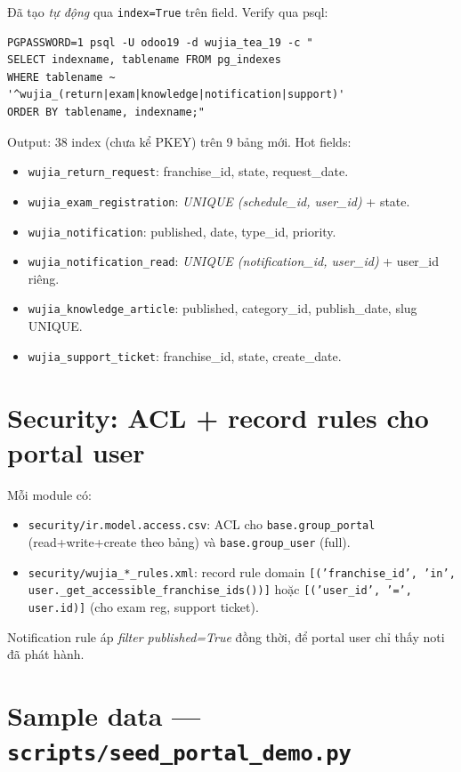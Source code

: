 Đã tạo \emph{tự động} qua \texttt{index=True} trên field. Verify qua psql:

\begin{lstlisting}[style=shell]
PGPASSWORD=1 psql -U odoo19 -d wujia_tea_19 -c "
SELECT indexname, tablename FROM pg_indexes
WHERE tablename ~ '^wujia_(return|exam|knowledge|notification|support)'
ORDER BY tablename, indexname;"
\end{lstlisting}

Output: 38 index (chưa kể PKEY) trên 9 bảng mới. Hot fields:

\begin{itemize}
    \item \texttt{wujia\_return\_request}: franchise\_id, state, request\_date.
    \item \texttt{wujia\_exam\_registration}: \emph{UNIQUE (schedule\_id, user\_id)} + state.
    \item \texttt{wujia\_notification}: published, date, type\_id, priority.
    \item \texttt{wujia\_notification\_read}: \emph{UNIQUE (notification\_id, user\_id)} + user\_id riêng.
    \item \texttt{wujia\_knowledge\_article}: published, category\_id, publish\_date, slug UNIQUE.
    \item \texttt{wujia\_support\_ticket}: franchise\_id, state, create\_date.
\end{itemize}

\section{Security: ACL + record rules cho portal user}

Mỗi module có:

\begin{itemize}
    \item \texttt{security/ir.model.access.csv}: ACL cho \texttt{base.group\_portal} (read+write+create theo bảng) và \texttt{base.group\_user} (full).
    \item \texttt{security/wujia\_*\_rules.xml}: record rule domain \texttt{[('franchise\_id', 'in', user.\_get\_accessible\_franchise\_ids())]} hoặc \texttt{[('user\_id', '=', user.id)]} (cho exam reg, support ticket).
\end{itemize}

Notification rule áp \emph{filter published=True} đồng thời, để portal user chỉ thấy noti đã phát hành.

\section{Sample data --- \texttt{scripts/seed\_portal\_demo.py}}


